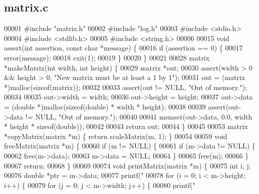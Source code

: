 \subsection{matrix.\+c}
\label{matrix_8c_source}

\begin{DoxyCode}
00001 \textcolor{preprocessor}{#include "matrix.h"}
00002 \textcolor{preprocessor}{#include "log.h"}
00003 \textcolor{preprocessor}{#include <stdio.h>}
00004 \textcolor{preprocessor}{#include <stdlib.h>}
00005 \textcolor{preprocessor}{#include <string.h>}
00006 
00015 \textcolor{keywordtype}{void} assert(\textcolor{keywordtype}{int} assertion, \textcolor{keyword}{const} \textcolor{keywordtype}{char} *message) \{
00016   \textcolor{keywordflow}{if} (assertion == 0) \{
00017     error(message);
00018     exit(1);
00019   \}
00020 \}
00021 
00028 matrix *makeMatrix(\textcolor{keywordtype}{int} width, \textcolor{keywordtype}{int} height) \{
00029   matrix *out;
00030   assert(width > 0 && height > 0, \textcolor{stringliteral}{"New matrix must be at least a 1 by 1"});
00031   out = (matrix *)malloc(\textcolor{keyword}{sizeof}(matrix));
00032 
00033   assert(out != NULL, \textcolor{stringliteral}{"Out of memory."});
00034 
00035   out->width = width;
00036   out->height = height;
00037   out->data = (\textcolor{keywordtype}{double} *)malloc(\textcolor{keyword}{sizeof}(\textcolor{keywordtype}{double}) * width * height);
00038 
00039   assert(out->data != NULL, \textcolor{stringliteral}{"Out of memory."});
00040 
00041   memset(out->data, 0.0, width * height * \textcolor{keyword}{sizeof}(\textcolor{keywordtype}{double}));
00042 
00043   \textcolor{keywordflow}{return} out;
00044 \}
00045 
00053 matrix *copyMatrix(matrix *m) \{ \textcolor{keywordflow}{return} scaleMatrix(m, 1); \}
00054 
00059 \textcolor{keywordtype}{void} freeMatrix(matrix *m) \{
00060   \textcolor{keywordflow}{if} (m != NULL) \{
00061     \textcolor{keywordflow}{if} (m->data != NULL) \{
00062       free(m->data);
00063       m->data = NULL;
00064     \}
00065     free(m);
00066   \}
00067   \textcolor{keywordflow}{return};
00068 \}
00069 
00074 \textcolor{keywordtype}{void} printMatrix(matrix *m) \{
00075   \textcolor{keywordtype}{int} i, j;
00076   \textcolor{keywordtype}{double} *ptr = m->data;
00077   printf(\textcolor{stringliteral}{"%
00078   \textcolor{keywordflow}{for} (i = 0; i < m->height; i++) \{
00079     \textcolor{keywordflow}{for} (j = 0; j < m->width; j++) \{
00080       printf(\textcolor{stringliteral}{" %
}}
\end{DoxyCode}
